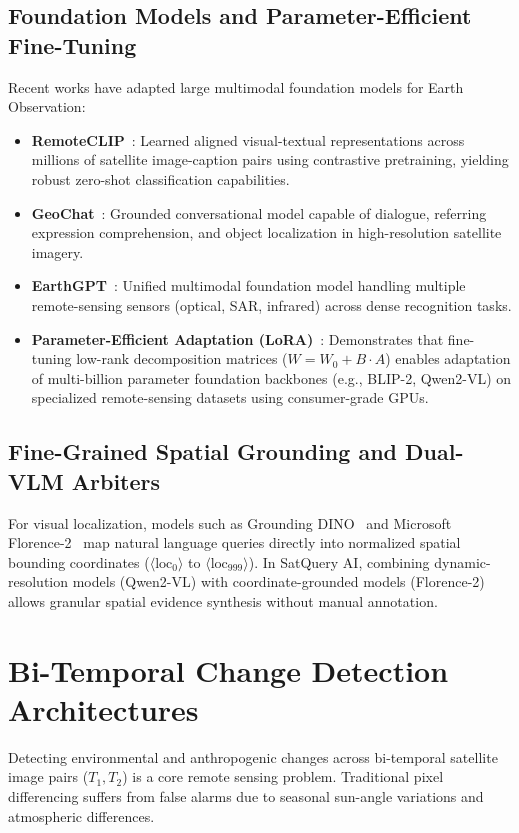 \documentclass[12pt,a4paper]{report}
\begin{document}
\subsection{Foundation Models and Parameter-Efficient Fine-Tuning}
Recent works have adapted large multimodal foundation models for Earth Observation:
\begin{itemize}
    \item \textbf{RemoteCLIP}~\cite{remoteclip}: Learned aligned visual-textual representations across millions of satellite image-caption pairs using contrastive pretraining, yielding robust zero-shot classification capabilities.
    \item \textbf{GeoChat}~\cite{geochat}: Grounded conversational model capable of dialogue, referring expression comprehension, and object localization in high-resolution satellite imagery.
    \item \textbf{EarthGPT}~\cite{earthgpt}: Unified multimodal foundation model handling multiple remote-sensing sensors (optical, SAR, infrared) across dense recognition tasks.
    \item \textbf{Parameter-Efficient Adaptation (LoRA)}~\cite{lora}: Demonstrates that fine-tuning low-rank decomposition matrices ($W = W_0 + B \cdot A$) enables adaptation of multi-billion parameter foundation backbones (e.g., BLIP-2, Qwen2-VL) on specialized remote-sensing datasets using consumer-grade GPUs.
\end{itemize}

\subsection{Fine-Grained Spatial Grounding and Dual-VLM Arbiters}
For visual localization, models such as Grounding DINO~\cite{grounding_dino} and Microsoft Florence-2~\cite{florence2} map natural language queries directly into normalized spatial bounding coordinates ($\langle\text{loc}_0\rangle$ to $\langle\text{loc}_{999}\rangle$). In SatQuery AI, combining dynamic-resolution models (Qwen2-VL) with coordinate-grounded models (Florence-2) allows granular spatial evidence synthesis without manual annotation.

\section{Bi-Temporal Change Detection Architectures}
Detecting environmental and anthropogenic changes across bi-temporal satellite image pairs ($T_1, T_2$) is a core remote sensing problem. Traditional pixel differencing suffers from false alarms due to seasonal sun-angle variations and atmospheric differences.
\end{document}
